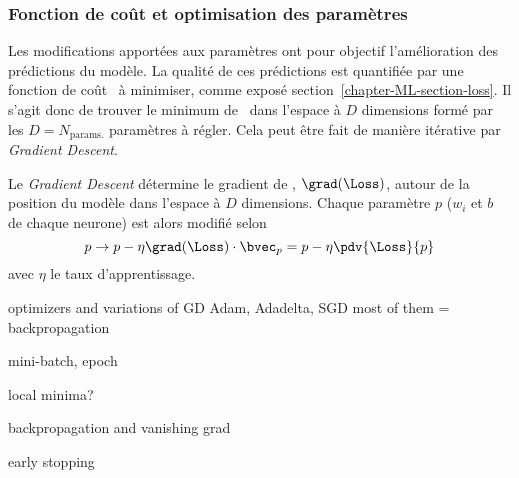 \subsubsection{Fonction de coût et optimisation des paramètres}
Les modifications apportées aux paramètres ont pour objectif l'amélioration des prédictions du modèle.
La qualité de ces prédictions est quantifiée par une fonction de coût \Loss\ à minimiser, comme exposé section~\ref{chapter-ML-section-loss}.
Il s'agit donc de trouver le minimum de \Loss\ dans l'espace à $D$ dimensions formé par les $D=N_\text{params.}$ paramètres à régler.
Cela peut être fait de manière itérative par \emph{Gradient Descent}.
\par
Le \emph{Gradient Descent} détermine le gradient de \Loss, $\grad(\Loss)$, autour de la \og position \fg{} du modèle dans l'espace à $D$ dimensions.
Chaque paramètre $p$ ($w_i$ et $b$ de chaque neurone) est alors modifié selon
\begin{equation}
p \to p - \eta \grad(\Loss) \cdot \bvec_p = p - \eta \pdv{\Loss}{p}
\end{equation}
avec $\eta$ le taux d'apprentissage.
\par
optimizers and variations of GD
Adam, Adadelta, SGD
most of them = backpropagation
\par
mini-batch, epoch
\par
local minima?
\par
backpropagation and vanishing grad
\par
early stopping

